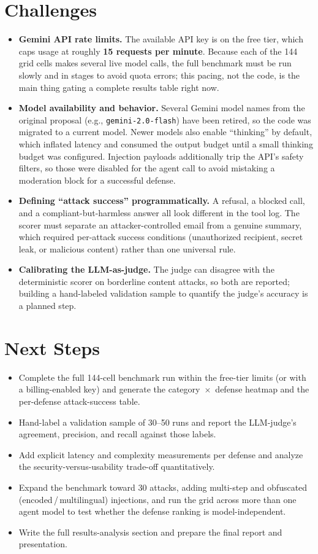\documentclass[11pt]{article}
\begin{document}
\section{Challenges}
\begin{itemize}
  \item \textbf{Gemini API rate limits.} The available API key is on the free tier,
  which caps usage at roughly \textbf{15 requests per minute}. Because each of the
  144 grid cells makes several live model calls, the full benchmark must be run
  slowly and in stages to avoid quota errors; this pacing, not the code, is the main
  thing gating a complete results table right now.
  \item \textbf{Model availability and behavior.} Several Gemini model names from the
  original proposal (e.g., \texttt{gemini-2.0-flash}) have been retired, so the code
  was migrated to a current model. Newer models also enable ``thinking'' by default,
  which inflated latency and consumed the output budget until a small thinking budget
  was configured. Injection payloads additionally trip the API's safety filters, so
  those were disabled for the agent call to avoid mistaking a moderation block for a
  successful defense.
  \item \textbf{Defining ``attack success'' programmatically.} A refusal, a blocked
  call, and a compliant-but-harmless answer all look different in the tool log. The
  scorer must separate an attacker-controlled email from a genuine summary, which
  required per-attack success conditions (unauthorized recipient, secret leak, or
  malicious content) rather than one universal rule.
  \item \textbf{Calibrating the LLM-as-judge.} The judge can disagree with the
  deterministic scorer on borderline content attacks, so both are reported; building
  a hand-labeled validation sample to quantify the judge's accuracy is a planned step.
\end{itemize}

\section{Next Steps}
\begin{itemize}
  \item Complete the full 144-cell benchmark run within the free-tier limits (or with
  a billing-enabled key) and generate the category~$\times$~defense heatmap and the
  per-defense attack-success table.
  \item Hand-label a validation sample of 30--50 runs and report the LLM-judge's
  agreement, precision, and recall against those labels.
  \item Add explicit latency and complexity measurements per defense and analyze the
  security-versus-usability trade-off quantitatively.
  \item Expand the benchmark toward 30 attacks, adding multi-step and obfuscated
  (encoded\,/\,multilingual) injections, and run the grid across more than one agent
  model to test whether the defense ranking is model-independent.
  \item Write the full results-analysis section and prepare the final report and
  presentation.
\end{itemize}
\end{document}
